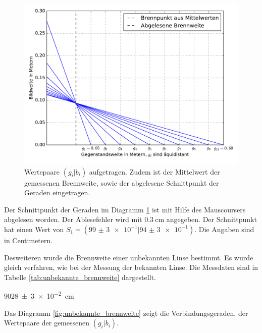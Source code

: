 \begin{figure}
  \centering
  \includegraphics[width=\textwidth]{Messung1_brennnweite_bekannt.pdf}
  \caption{Wertepaare $(g_i|b_i)$ aufgetragen. Zudem ist der Mittelwert der gemessenen Brennweite, sowie der abgelesene Schnittpunkt der Geraden eingetragen.}
  \label{fig:brennweite_bekannt}
\end{figure}

Der Schnittpunkt der Geraden im Diagramm \ref{fig:brennweite_bekannt}
ist mit Hilfe des Mauscoursers abgelesen worden. Der Ablesefehler wird mit
$\SI{0,3}{\centi\meter}$ angegeben.
Der Schnittpunkt hat einen Wert von $S_1 = (\num{99(3)e-1}|\num{94(3)e-1})$.
Die Angaben sind in Centimetern.

Desweiteren wurde die Brennweite einer unbekannten Linse bestimmt.
Es wurde gleich verfahren, wie bei der Messung der bekannten Linse.
Die Messdaten sind in Tabelle \ref{tab:unbekannte_brennweite} dargestellt.

\begin{description}
  \centering
  \item[$<f_2>\ua{gemessen}=$]\SI{9028(3)e-2}{\centi\meter}
\end{description}

Das Diagramm \ref{fig:unbekannte_brennweite} zeigt die Verbindungsgeraden,
der Wertepaare der gemessenen $(g_i|b_i)$.

